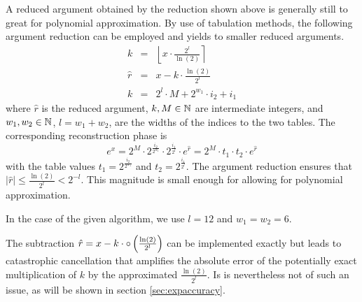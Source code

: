 A reduced argument obtained by the reduction shown above is generally
still to great for polynomial approximation. By use of tabulation
methods, the following argument reduction can be employed and yields
to smaller reduced arguments.
\begin{eqnarray*}
k & = & \left \lfloor x \cdot \frac{2^l}{\ln\left(2 \right)} \right \rceil \\
\hat{r} & = & x - k \cdot \frac{\ln\left( 2 \right)}{2^l} \\
k & = & 2^l \cdot M + 2^{w_1} \cdot i_2 + i_1 
\end{eqnarray*}
where $\hat{r}$ is the reduced argument, $k, M \in \mathbb {N}$ are intermediate
integers, and $w_1, w_2 \in \mathbb {N}$, $l = w_1 + w_2$, are the widths of
the indices to the two tables. The corresponding reconstruction phase
is
$$e^x = 2^M \cdot 2^{\frac{i_2}{2^{w_1}}} \cdot 2^{\frac{i_1}{2^l}}
\cdot e^{\hat{r}} = 2^M \cdot t_1 \cdot t_2 \cdot e^{\hat{r}}$$ with the table values $t_1 =
2^{\frac{i_2}{2^{w_1}}}$ and $t_2 = 2^{\frac{i_1}{2^l}}$. The argument
reduction ensures that $\left \vert \hat{r} \right \vert \leq
\frac{\ln\left( 2 \right)}{2^l} < 2^{-l}$. This magnitude is small enough for 
allowing for polynomial approximation.

In the case of the given algorithm, we use $l = 12$ and $w_1 = w_2 = 6$.

The subtraction $\hat{r} = x - k \cdot \circ \left(\frac{\ln\left( 2
\right)}{2^l}\right)$ can be implemented exactly but leads to
catastrophic cancellation that amplifies the absolute error of the
potentially exact multiplication of $k$ by the approximated
$\frac{\ln\left( 2 \right)}{2^l}$. Is is nevertheless not of such an
issue, as will be shown in section \ref{sec:expaccuracy}.                  %

